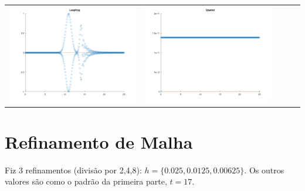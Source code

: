 \documentclass{article}
\begin{document}
\begin{table}
\begin{tabular}{ccccc}
            \includegraphics[scale = 0.15]{Leapfrog34.png} & \includegraphics[scale = 0.15]{Upwind34.png}
        \end{tabular}
    \label{tbl:table_of_figures}
\end{table}


\newpage
\section{Refinamento de Malha}
Fiz 3 refinamentos (divisão por 2,4,8): $h = \{0.025,0.0125,0.00625\}$. Os outros valores são como o padrão da primeira parte, $t = 17$.
\end{document}
